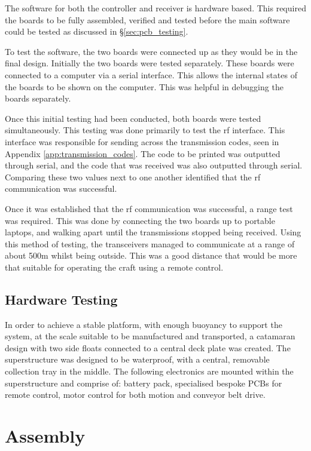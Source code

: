 \documentclass [12pt]{article}
\begin{document}
The software for both the controller and receiver is hardware based. This required the boards to be fully assembled, verified and tested before the main software could be tested as discussed in §\ref{sec:pcb_testing}. 

To test the software, the two boards were connected up as they would be in the final design. Initially the two boards were tested separately. These boards were connected to a computer via a serial interface. This allows the internal states of the boards to be shown on the computer. This was helpful in debugging the boards separately. 

Once this initial testing had been conducted, both boards were tested simultaneously. This testing was done primarily to test the \gls{rf} interface. This interface was responsible for sending across the transmission codes, seen in Appendix \ref{app:transmission_codes}. The code to be printed was outputted through serial, and the code that was received was also outputted through serial. Comparing these two values next to one another identified that the \gls{rf} communication was successful. 

Once it was established that the \gls{rf} communication was successful, a range test was required. This was done by connecting the two boards up to portable laptops, and walking apart until the transmissions stopped being received. Using this method of testing, the transceivers managed to communicate at a range of about 500m whilst being outside. This was a good distance that would be more that suitable for operating the craft using a remote control.  

\subsection{Hardware Testing}

In order to achieve a stable platform, with enough buoyancy to support the system, at the scale suitable to be manufactured and transported, a catamaran design with two side floats connected to a central deck plate was created.
The superstructure was designed to be waterproof, with a central, removable collection tray in the middle.
The following electronics are mounted within the superstructure and comprise of: battery pack, specialised bespoke PCBs for remote control, motor control for both motion and conveyor belt drive.


\section{Assembly}
\end{document}
